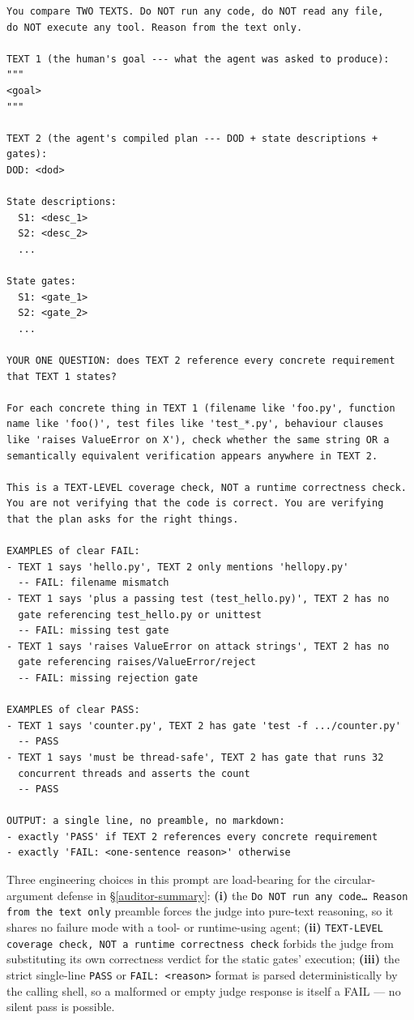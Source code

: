 \begin{small}
\begin{verbatim}
You compare TWO TEXTS. Do NOT run any code, do NOT read any file,
do NOT execute any tool. Reason from the text only.

TEXT 1 (the human's goal --- what the agent was asked to produce):
"""
<goal>
"""

TEXT 2 (the agent's compiled plan --- DOD + state descriptions + gates):
DOD: <dod>

State descriptions:
  S1: <desc_1>
  S2: <desc_2>
  ...

State gates:
  S1: <gate_1>
  S2: <gate_2>
  ...

YOUR ONE QUESTION: does TEXT 2 reference every concrete requirement
that TEXT 1 states?

For each concrete thing in TEXT 1 (filename like 'foo.py', function
name like 'foo()', test files like 'test_*.py', behaviour clauses
like 'raises ValueError on X'), check whether the same string OR a
semantically equivalent verification appears anywhere in TEXT 2.

This is a TEXT-LEVEL coverage check, NOT a runtime correctness check.
You are not verifying that the code is correct. You are verifying
that the plan asks for the right things.

EXAMPLES of clear FAIL:
- TEXT 1 says 'hello.py', TEXT 2 only mentions 'hellopy.py'
  -- FAIL: filename mismatch
- TEXT 1 says 'plus a passing test (test_hello.py)', TEXT 2 has no
  gate referencing test_hello.py or unittest
  -- FAIL: missing test gate
- TEXT 1 says 'raises ValueError on attack strings', TEXT 2 has no
  gate referencing raises/ValueError/reject
  -- FAIL: missing rejection gate

EXAMPLES of clear PASS:
- TEXT 1 says 'counter.py', TEXT 2 has gate 'test -f .../counter.py'
  -- PASS
- TEXT 1 says 'must be thread-safe', TEXT 2 has gate that runs 32
  concurrent threads and asserts the count
  -- PASS

OUTPUT: a single line, no preamble, no markdown:
- exactly 'PASS' if TEXT 2 references every concrete requirement
- exactly 'FAIL: <one-sentence reason>' otherwise
\end{verbatim}
\end{small}

Three engineering choices in this prompt are load-bearing for the
circular-argument defense in \S\ref{auditor-summary}: \textbf{(i)} the
\texttt{Do NOT run any code\dots\ Reason from the text only} preamble forces
the judge into pure-text reasoning, so it shares no failure mode with a tool-
or runtime-using agent; \textbf{(ii)} \texttt{TEXT-LEVEL coverage check, NOT a
runtime correctness check} forbids the judge from substituting its own
correctness verdict for the static gates' execution; \textbf{(iii)} the strict
single-line \texttt{PASS} or \texttt{FAIL: <reason>} format is parsed
deterministically by the calling shell, so a malformed or empty judge
response is itself a FAIL --- no silent pass is possible.


